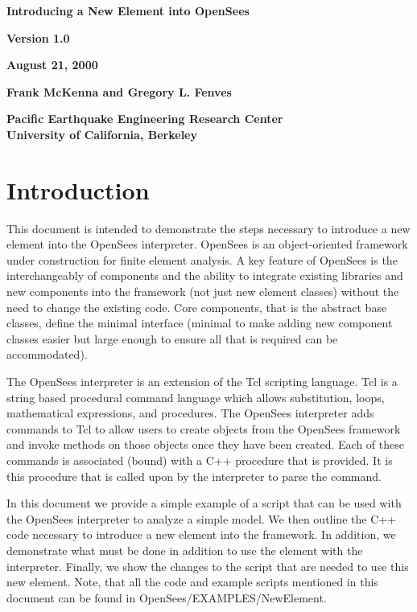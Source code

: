 \documentclass[12pt]{article}
\begin{document}


\begin{center}
{\bf \Large Introducing a New Element into OpenSees} 

{\bf Version 1.0} 

{\bf  August 21, 2000} 

{\bf  Frank McKenna and Gregory L. Fenves} 

{\bf  Pacific Earthquake Engineering Research Center \\
      University of California, Berkeley}
\end{center}

\vspace{.2in}
\section{Introduction}
This document is intended to demonstrate the steps necessary 
to introduce a new element into the OpenSees interpreter. OpenSees is
an object-oriented framework under construction for finite element
analysis. A key feature of OpenSees is the interchangeably of
components and the ability to integrate existing libraries and new
components into the framework (not just new element classes) without
the need to change the existing code. Core components, that is the
abstract base classes, define the minimal interface (minimal to make
adding new component classes easier but large enough to ensure all
that is required can be accommodated). 

The OpenSees interpreter is an extension of the Tcl scripting language.
Tcl is a string based procedural command language which allows
substitution, loops, mathematical expressions, and procedures. 
The OpenSees interpreter adds commands to Tcl to allow users to create
objects from the OpenSees framework and invoke methods on those
objects once they have been created. Each of these commands is
associated (bound) with a C++ procedure that is provided. It is this
procedure that is called upon by the interpreter to parse the command. 

In this document we provide a simple example of a script that can be
used with the OpenSees interpreter to analyze a simple model. We then
outline the C++ code necessary to introduce a new element into the
framework. In addition, we demonstrate what must be done in addition to
use the element with the interpreter. Finally, we show the changes to
the script that are needed to use this new element. Note, that all the
code and example scripts mentioned in this document can be found in
OpenSees/EXAMPLES/NewElement. 
\end{document}
